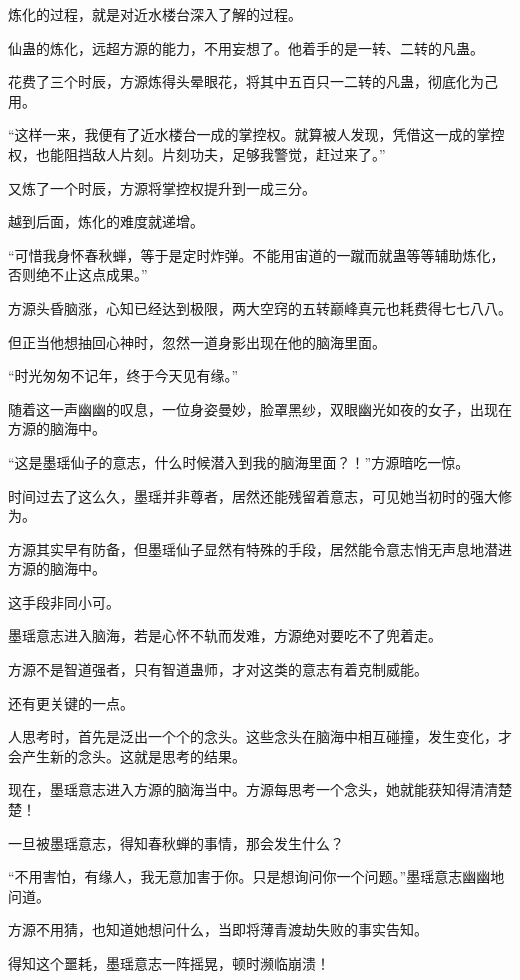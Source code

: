 \begin{this_body}
炼化的过程，就是对近水楼台深入了解的过程。

仙蛊的炼化，远超方源的能力，不用妄想了。他着手的是一转、二转的凡蛊。

花费了三个时辰，方源炼得头晕眼花，将其中五百只一二转的凡蛊，彻底化为己用。

“这样一来，我便有了近水楼台一成的掌控权。就算被人发现，凭借这一成的掌控权，也能阻挡敌人片刻。片刻功夫，足够我警觉，赶过来了。”

又炼了一个时辰，方源将掌控权提升到一成三分。

越到后面，炼化的难度就递增。

“可惜我身怀春秋蝉，等于是定时炸弹。不能用宙道的一蹴而就蛊等等辅助炼化，否则绝不止这点成果。”

方源头昏脑涨，心知已经达到极限，两大空窍的五转巅峰真元也耗费得七七八八。

但正当他想抽回心神时，忽然一道身影出现在他的脑海里面。

“时光匆匆不记年，终于今天见有缘。”

随着这一声幽幽的叹息，一位身姿曼妙，脸罩黑纱，双眼幽光如夜的女子，出现在方源的脑海中。

“这是墨瑶仙子的意志，什么时候潜入到我的脑海里面？！”方源暗吃一惊。

时间过去了这么久，墨瑶并非尊者，居然还能残留着意志，可见她当初时的强大修为。

方源其实早有防备，但墨瑶仙子显然有特殊的手段，居然能令意志悄无声息地潜进方源的脑海中。

这手段非同小可。

墨瑶意志进入脑海，若是心怀不轨而发难，方源绝对要吃不了兜着走。

方源不是智道强者，只有智道蛊师，才对这类的意志有着克制威能。

还有更关键的一点。

人思考时，首先是泛出一个个的念头。这些念头在脑海中相互碰撞，发生变化，才会产生新的念头。这就是思考的结果。

现在，墨瑶意志进入方源的脑海当中。方源每思考一个念头，她就能获知得清清楚楚！

一旦被墨瑶意志，得知春秋蝉的事情，那会发生什么？

“不用害怕，有缘人，我无意加害于你。只是想询问你一个问题。”墨瑶意志幽幽地问道。

方源不用猜，也知道她想问什么，当即将薄青渡劫失败的事实告知。

得知这个噩耗，墨瑶意志一阵摇晃，顿时濒临崩溃！


\end{this_body}
